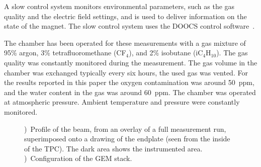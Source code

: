 \documentclass[preprint]{elsarticle}
\begin{document}
A slow control system monitors environmental parameters, such as the gas quality and the electric field settings, and is used to deliver information on the state of the magnet. The slow control system uses the DOOCS control software~\cite{TPCslowcontrol}. 

The chamber has been operated for these measurements with a gas mixture of 95\% argon, 3\% tetrafluoromethane (CF$_4$), and 2\% isobutane (iC$_4$H$_{10}$). The gas quality was constantly monitored during the measurement. The gas volume in the chamber was exchanged typically every six hours, the used gas was vented. For the results reported in this paper the oxygen contamination was around \SI{50}{ppm}, and the water content in the gas was around \SI{60}{ppm}. The chamber was operated at atmospheric pressure. Ambient temperature and pressure were constantly monitored. 

\begin{figure}[htb!]
\begin{subfigure}[b]{0.47\textwidth}
\iftoggle{blackandwhite}{\texttt{[image: figures/Endplate\_track-numBW.png]}}{\texttt{[image: figures/Endplate\_track-num.png]}}
\caption{}
\label{sfig:endplateNumbered}
\end{subfigure}
\hfill
\begin{subfigure}[b]{0.47\textwidth}
\iftoggle{blackandwhite}{\texttt{[image: figures/gem-voltages-fieldsBW.pdf]}}{\texttt{[image: figures/gem-voltages-fields.pdf]}}
\caption{}
\label{sfig:gemVE}
\end{subfigure}
\caption{\small \protect{})~Profile of the beam, from an overlay of a full measurement run, superimposed onto a drawing of the endplate (seen from the inside of the TPC). The dark area shows the instrumented area. \protect{})~Configuration of the GEM stack. }
\label{fig:TB}
\end{figure}
\end{document}
